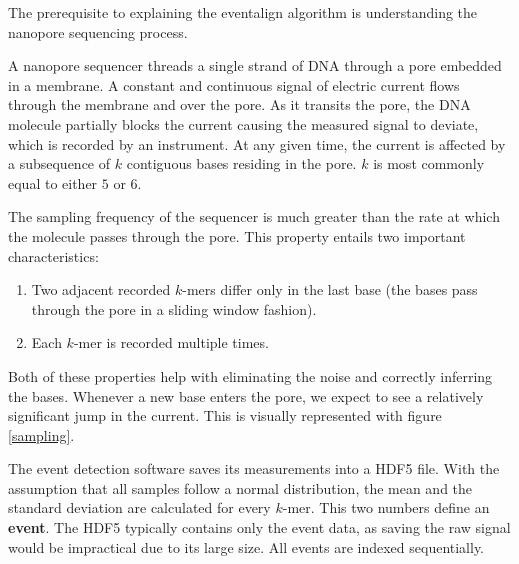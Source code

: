 \documentclass[times, utf, seminar]{fer}
\begin{document}
The prerequisite to explaining the eventalign algorithm is understanding the nanopore
sequencing process.

A nanopore sequencer threads a single strand of DNA through a pore embedded in a membrane. A constant and continuous signal of electric current flows through the membrane and over the pore. As it transits the pore, the DNA molecule partially blocks the current causing the measured signal to deviate, which is recorded by an instrument. At any given time, the current
is affected by a subsequence of $k$ contiguous bases residing in the pore. $k$ is most commonly equal to either $5$ or $6$.

The sampling frequency of the sequencer is much greater than the rate at which the molecule passes through the pore.
This property entails two important characteristics:
\begin{enumerate}
	\item Two adjacent recorded $k$-mers differ only in the last base (the bases pass through the pore in a sliding window fashion).
	\item Each $k$-mer is recorded multiple times.
\end{enumerate}
Both of these properties help with eliminating the noise and correctly inferring the bases.
Whenever a new base enters the pore, we expect to see a relatively significant jump in the current. This is visually represented with figure \ref{sampling}.

The event detection software saves its measurements into a HDF5 file. With the assumption that all samples follow a normal distribution, the mean and the standard deviation are calculated for every $k$-mer. This two numbers define an \textbf{event}. The HDF5 typically contains only
the event data, as saving the raw signal would be impractical due to its large size. All events are indexed sequentially.
\end{document}
